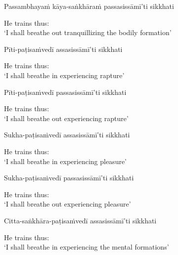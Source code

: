 Passambhayaṁ kāya-saṅkhāraṁ passasissāmī'ti sikkhati

\begin{english}
  He trains thus:\\
  `I shall breathe out tranquillizing the bodily formation'
\end{english}

Pīti-paṭisaṁvedī assasissāmī'ti sikkhati

\begin{english}
  He trains thus:\\
  `I shall breathe in experiencing rapture'
\end{english}

Pīti-paṭisaṁvedī passasissāmī'ti sikkhati

\begin{english}
  He trains thus:\\
  `I shall breathe out experiencing rapture'
\end{english}

Sukha-paṭisaṁvedī assasissāmī'ti sikkhati

\begin{english}
  He trains thus:\\
  `I shall breathe in experiencing pleasure'
\end{english}

Sukha-paṭisaṁvedī passasissāmī'ti sikkhati

\begin{english}
  He trains thus:\\
  `I shall breathe out experiencing pleasure'
\end{english}

Citta-saṅkhāra-paṭisaṁvedī assasissāmī'ti sikkhati

\begin{english}
  He trains thus:\\
  `I shall breathe in experiencing the mental formations'\makeatletter\hyperlink{endnote69-appendix}\makeatother
\end{english}


